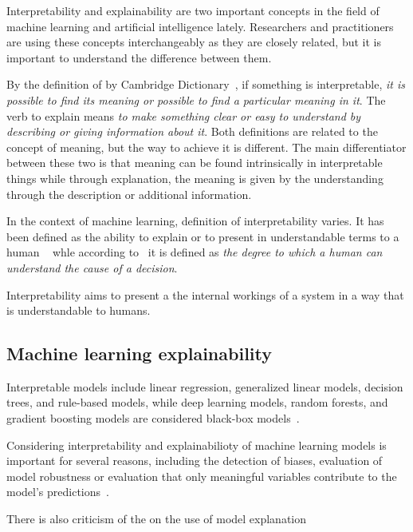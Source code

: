 
Interpretability and explainability are two important concepts in the field of machine learning and artificial intelligence lately.
Researchers and practitioners are using these concepts interchangeably as they are closely related, but it is important to understand the difference between them.

By the definition of by Cambridge Dictionary~\cite{dictionary2017cambridge}, if something is interpretable, \emph{it is possible to find its meaning or possible to find a particular meaning in it}.
The verb to explain means \emph{to make something clear or easy to understand by describing or giving information about it}.
Both definitions are related to the concept of meaning, but the way to achieve it is different.
The main differentiator between these two is that meaning can be found intrinsically in interpretable things while through explanation, the meaning is given by the understanding through the description or additional information.

In the context of machine learning, definition of interpretability varies.
It has been defined as the ability to explain or to present in understandable terms to a
human ~\cite[Finale]{Finale2017} whle according to~\cite{miller2019explanation} it is defined as \emph{the degree to which a human can understand the cause of a decision}.

Interpretability aims to present a the internal workings of a system in a way that is understandable to humans\cite{gilpin2018explaining}.
%

\subsection{Machine learning explainability}
Interpretable models include linear regression, generalized linear models, decision trees, and rule-based models, while deep learning models, random forests, and gradient boosting models are considered black-box models~\cite{Guidotti2018ASO}.


Considering interpretability and explainabilioty of machine learning models is important for several reasons, including the detection of biases, evaluation of model robustness or evaluation that only meaningful variables contribute to the model's predictions~\cite{BARREDOARRIETA202082}.


There is also criticism of the on the use of model explanation~\cite{rudin2019stop}

